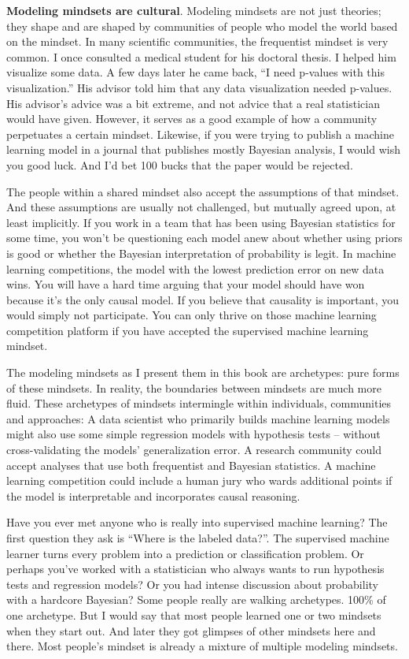 \documentclass[
  10pt,
]{scrbook}
\begin{document}
\textbf{Modeling mindsets are cultural}.
Modeling mindsets are not just theories; they shape and are shaped by communities of people who model the world based on the mindset.
In many scientific communities, the frequentist mindset is very common.
I once consulted a medical student for his doctoral thesis.
I helped him visualize some data.
A few days later he came back, ``I need p-values with this visualization.''
His advisor told him that any data visualization needed p-values.
His advisor's advice was a bit extreme, and not advice that a real statistician would have given.
However, it serves as a good example of how a community perpetuates a certain mindset.
Likewise, if you were trying to publish a machine learning model in a journal that publishes mostly Bayesian analysis, I would wish you good luck.
And I'd bet 100 bucks that the paper would be rejected.

The people within a shared mindset also accept the assumptions of that mindset.
And these assumptions are usually not challenged, but mutually agreed upon, at least implicitly.
If you work in a team that has been using Bayesian statistics for some time, you won't be questioning each model anew about whether using priors is good or whether the Bayesian interpretation of probability is legit.
In machine learning competitions, the model with the lowest prediction error on new data wins.
You will have a hard time arguing that your model should have won because it's the only causal model.
If you believe that causality is important, you would simply not participate.
You can only thrive on those machine learning competition platform if you have accepted the supervised machine learning mindset.

The modeling mindsets as I present them in this book are archetypes: pure forms of these mindsets.
In reality, the boundaries between mindsets are much more fluid.
These archetypes of mindsets intermingle within individuals, communities and approaches:
A data scientist who primarily builds machine learning models might also use some simple regression models with hypothesis tests -- without cross-validating the models' generalization error.
A research community could accept analyses that use both frequentist and Bayesian statistics.
A machine learning competition could include a human jury who wards additional points if the model is interpretable and incorporates causal reasoning.

Have you ever met anyone who is really into supervised machine learning?
The first question they ask is ``Where is the labeled data?''.
The supervised machine learner turns every problem into a prediction or classification problem.
Or perhaps you've worked with a statistician who always wants to run hypothesis tests and regression models?
Or you had intense discussion about probability with a hardcore Bayesian?
Some people really are walking archetypes. 100\% of one archetype.
But I would say that most people learned one or two mindsets when they start out.
And later they got glimpses of other mindsets here and there.
Most people's mindset is already a mixture of multiple modeling mindsets.
\end{document}
